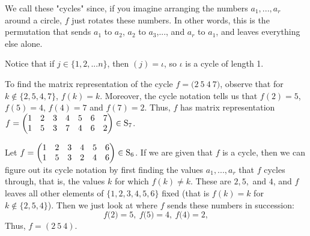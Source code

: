 \documentclass[11pt,dvipsnames]{book}
\numberwithin{figure}{section} %
\numberwithin{table}{section} %
\begin{document}
We call these "cycles" since, if you imagine arranging the numbers $a_{1},...,a_{r}$ around a circle, $f$ just rotates these numbers. In other words, this is the permutation that sends $a_{1}$ to $a_{2}$, $a_{2}$ to $a_{3}$,..., and $a_{r}$ to $a_{1}$, and leaves everything else alone. 

Notice that if $j\in \{1,2,...n\}$, then $(j)=\iota$, so $\iota$ is a cycle of length 1.


 \begin{example}
To find the matrix representation of the cycle $f=\big(2\ 5\ 4\ 7\big)$, observe that for $k\not\in \{2,5,4,7\}$, $f(k)=k$. Moreover, the cycle notation tells us that $f(2)=5$, $f(5)=4$, $f(4)=7$ and $f(7)=2$. Thus, $f$ has matrix representation $f=\left(\begin{matrix} %
1 & 2 & 3 & 4 & 5 & 6 & 7 \cr%
1 & 5 & 3 & 7 & 4 & 6 & 2 \cr%
\end{matrix}\right)\in\mathrm{S}_{7}$. 

\end{example}




 \begin{example}
Let $f=\left(\begin{matrix} %
1 & 2 & 3 & 4 & 5 & 6\cr%
1 & 5 & 3 & 2 & 4 & 6 \cr%
\end{matrix}\right)\in\mathrm{S}_6$.  If we are given that $f$ is a cycle, then we can figure out its cycle notation by first finding the values $a_{1},...,a_{r}$ that $f$ cycles through, that is, the values $k$ for which $f(k)\neq k$. These are $2,5,$ and $4$, and $f$ leaves all other elements of $\{1,2,3,4,5,6\}$
fixed (that is $f(k)=k$ for $k\not\in \{2,5,4\}$). Then we just look at where $f$ sends these numbers in succession:
$$
f\big(2\big)=5,\  f\big(5\big)=4,\  f\big(4\big)=2,
$$
Thus, $f=(2\ 5\ 4)$.
\end{example}
\end{document}
